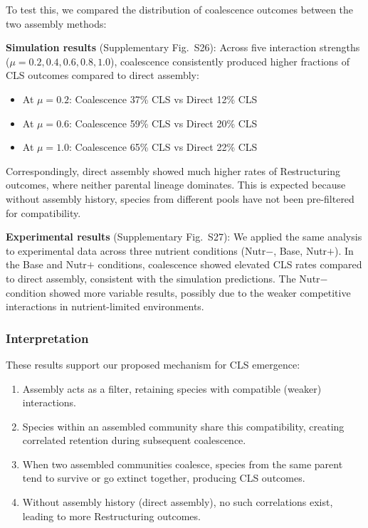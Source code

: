 To test this, we compared the distribution of coalescence outcomes between the two assembly methods:

\textbf{Simulation results} (Supplementary Fig.~S26): Across five interaction strengths ($\mu = 0.2, 0.4, 0.6, 0.8, 1.0$), coalescence consistently produced higher fractions of CLS outcomes compared to direct assembly:
\begin{itemize}
    \item At $\mu = 0.2$: Coalescence 37\% CLS vs Direct 12\% CLS
    \item At $\mu = 0.6$: Coalescence 59\% CLS vs Direct 20\% CLS
    \item At $\mu = 1.0$: Coalescence 65\% CLS vs Direct 22\% CLS
\end{itemize}

Correspondingly, direct assembly showed much higher rates of Restructuring outcomes, where neither parental lineage dominates. This is expected because without assembly history, species from different pools have not been pre-filtered for compatibility.

\textbf{Experimental results} (Supplementary Fig.~S27): We applied the same analysis to experimental data across three nutrient conditions (Nutr$-$, Base, Nutr$+$). In the Base and Nutr$+$ conditions, coalescence showed elevated CLS rates compared to direct assembly, consistent with the simulation predictions. The Nutr$-$ condition showed more variable results, possibly due to the weaker competitive interactions in nutrient-limited environments.

\subsubsection*{Interpretation}

These results support our proposed mechanism for CLS emergence:
\begin{enumerate}
    \item Assembly acts as a filter, retaining species with compatible (weaker) interactions.
    \item Species within an assembled community share this compatibility, creating correlated retention during subsequent coalescence.
    \item When two assembled communities coalesce, species from the same parent tend to survive or go extinct together, producing CLS outcomes.
    \item Without assembly history (direct assembly), no such correlations exist, leading to more Restructuring outcomes.
\end{enumerate}

